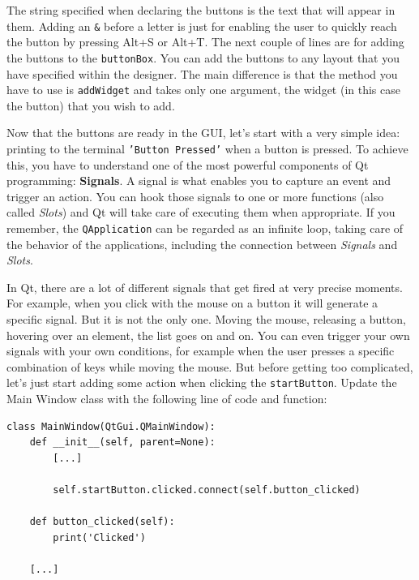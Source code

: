 The string specified when declaring the buttons is the text that will
appear in them. Adding an \texttt{\&} before a letter is just for
enabling the user to quickly reach the button by pressing Alt+S or Alt+T.
The next couple of lines are for adding the buttons to the
\texttt{buttonBox}. You can add the buttons to any layout that you have
specified within the designer. The main difference is that the method
you have to use is \texttt{addWidget} and takes only one argument, the
widget (in this case the button) that you wish to add.


Now that the buttons are ready in the {GUI}, let's start with a very
simple idea: printing to the terminal \texttt{'Button Pressed'} when a button
is pressed. To achieve this, you have to understand one of the most
powerful components of Qt programming: \textbf{Signals}. A signal is
what enables you to capture an event and trigger an action. You can hook
those signals to one or more functions (also called \emph{Slots}) and Qt
will take care of executing them when appropriate. If you remember, the
\texttt{QApplication} can be regarded as an infinite loop, taking care
of the behavior of the applications, including the connection between
\emph{Signals} and \emph{Slots}.

In Qt, there are a lot of different signals that get fired at very
precise moments. For example, when you click with the mouse on a button
it will generate a specific signal. But it is not the only one. Moving
the mouse, releasing a button, hovering over an element, the list goes
on and on. You can even trigger your own signals with your own
conditions, for example when the user presses a specific combination of
keys while moving the mouse. But before getting too complicated, let's
just start adding some action when clicking the \texttt{startButton}.
Update the Main Window class with the following line of code and
function:

\begin{verbatim}
class MainWindow(QtGui.QMainWindow):
    def __init__(self, parent=None):
        [...]

        self.startButton.clicked.connect(self.button_clicked)

    def button_clicked(self):
        print('Clicked')

    [...]
\end{verbatim}

